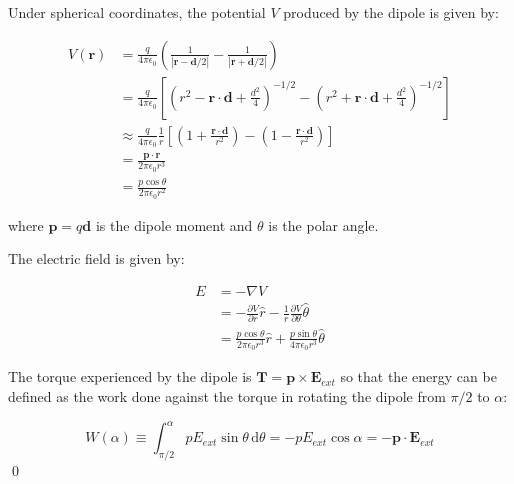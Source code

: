 \documentclass[12pt]{article}
\begin{document}

Under spherical coordinates, the potential $V$ produced by the dipole is given by:

\begin{equation}
\begin{split}
    V(\mathbf{r}) &= \frac{q}{4\pi\epsilon_{0}} \left( \frac{1}{\left\lvert \mathbf{r} - \mathbf{d}/2 \right\rvert} - \frac{1}{\left\lvert \mathbf{r} + \mathbf{d}/2 \right\rvert}\right) \\
    &= \frac{q}{4\pi\epsilon_{0}} \left[ \left( r^{2} - \mathbf{r} \cdot \mathbf{d} + \frac{d^{2}}{4} \right)^{-1/2} - \left( r^{2} + \mathbf{r} \cdot \mathbf{d} + \frac{d^{2}}{4} \right)^{-1/2} \right] \\
    &\approx \frac{q}{4\pi\epsilon_{0}} \frac{1}{r} \left[ \left( 1 + \frac{\mathbf{r} \cdot \mathbf{d}}{r^{2}} \right) - \left( 1 - \frac{\mathbf{r} \cdot \mathbf{d}}{r^{2}} \right) \right] \\
    &= \frac{\mathbf{p} \cdot \mathbf{r}}{2\pi\epsilon_{0}r^{3}} \\
    &= \frac{p \cos{\theta}}{2\pi\epsilon_{0}r^{2}}
\end{split}
\end{equation}

where $\mathbf{p} = q\mathbf{d}$ is the dipole moment and $\theta$ is the polar angle.

The electric field is given by:

\begin{equation}
\begin{split}
    E &= -\nabla V \\
    &= - \frac{\partial V}{\partial r} \hat{r} - \frac{1}{r} \frac{\partial V}{\partial \theta} \hat{\theta} \\
    &= \frac{p \cos{\theta}}{2\pi\epsilon_{0}r^{3}} \hat{r} + \frac{p \sin{\theta}}{4\pi\epsilon_{0}r^{3}} \hat{\theta}
\end{split}
\end{equation}

The torque experienced by the dipole is $\mathbf{T} = \mathbf{p} \times \mathbf{E}_{ext}$ so that the energy can be defined as the work done against the torque in rotating the dipole from $\pi/2$ to $\alpha$:

\begin{equation}
    W(\alpha) \equiv \int_{\pi/2}^{\alpha} p E_{ext} \sin{\theta} \, \mathrm{d}\theta = -p E_{ext} \cos{\alpha} = - \mathbf{p} \cdot \mathbf{E}_{ext}
\end{equation}
\qed
\end{document}
